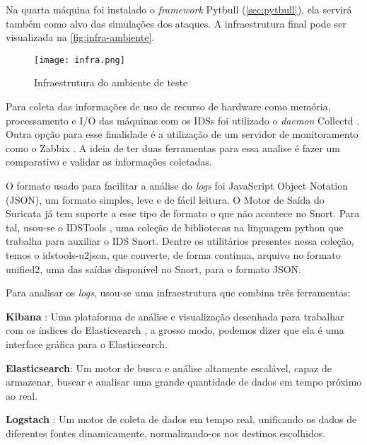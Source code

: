 Na quarta máquina foi instalado o \textit{framework} Pytbull (\autoref{sec:pytbull}), ela servirá também como alvo das simulações dos ataques. A infraestrutura final pode ser visualizada na \autoref{fig:infra-ambiente}.

\begin{figure}[!htb]
\centering
\caption{Infraestrutura do ambiente de teste}
\texttt{[image: infra.png]}
\label{fig:infra-ambiente}
\end{figure}

Para coleta das informações de uso de recurso de hardware como memória, processamento e I/O das máquinas com os IDSs foi utilizado o \textit{daemon} Collectd \cite{collectd}. Outra opção para esse finalidade é a utilização de um servidor de monitoramento como o Zabbix \cite{zabbix}. A ideia de ter duas ferramentas para essa analise é fazer um comparativo e validar as informações coletadas.

O formato usado para facilitar a análise do \textit{logs} foi JavaScript Object Notation (JSON), um formato simples, leve e de fácil leitura. O Motor de Saída do Suricata já tem suporte a esse tipo de formato o que não acontece no Snort. Para tal, usou-se o IDSTools \cite{py-idstools}, uma coleção de bibliotecas na linguagem python que trabalha para auxiliar o IDS Snort. Dentre os utilitários presentes nessa coleção, temos o idstools-u2json, que converte, de forma continua, arquivo no formato unified2, uma das saídas disponível no Snort, para o formato JSON.

Para analisar os \textit{logs}, usou-se uma infraestrutura que combina três ferramentas:

\begin{alineas}
\item \textbf{Kibana} \cite{kibana}: Uma plataforma de análise e visualização desenhada para trabalhar com os índices do Elasticsearch \cite{elasticsearch}, a grosso modo, podemos dizer que ela é uma interface gráfica para o Elasticsearch. 
\item \textbf{Elasticsearch}: Um motor de busca e análise altamente escalável, capaz de armazenar, buscar e analisar uma grande quantidade de dados em tempo próximo ao real. 
\item \textbf{Logstach} \cite{logstach}: Um motor de coleta de dados em tempo real, unificando os dados de diferentes fontes dinamicamente, normalizando-os nos destinos escolhidos.
\end{alineas}

